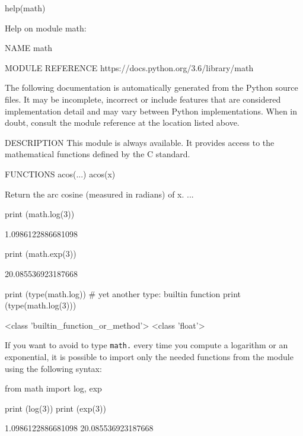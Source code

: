 \begin{ipython}
help(math)
\end{ipython}
\begin{ioutput}
Help on module math:

NAME
math

MODULE REFERENCE
https://docs.python.org/3.6/library/math

The following documentation is automatically generated from the Python
source files.  It may be incomplete, incorrect or include features that
are considered implementation detail and may vary between Python
implementations.  When in doubt, consult the module reference at the
location listed above.

DESCRIPTION
This module is always available.  It provides access to the
mathematical functions defined by the C standard.

FUNCTIONS
acos(...)
acos(x)

Return the arc cosine (measured in radians) of x.
...
\end{ioutput}

\begin{ipython}
print (math.log(3))
\end{ipython}
\begin{ioutput}
1.0986122886681098	
\end{ioutput}

\begin{ipython}
print (math.exp(3))
\end{ipython}
\begin{ioutput}
20.085536923187668	
\end{ioutput}

\begin{ipython}
print (type(math.log)) # yet another type: builtin function
print (type(math.log(3)))
\end{ipython}
\begin{ioutput}
<class 'builtin\_function\_or\_method'>
<class 'float'>	
\end{ioutput}

If you want to avoid to type \texttt{math.} every time you compute a logarithm or an exponential, it is possible to import only the needed functions from the module using the following syntax:

\begin{ipython}
from math import log, exp

print (log(3))
print (exp(3))
\end{ipython}
\begin{ioutput}
1.0986122886681098
20.085536923187668	
\end{ioutput}

